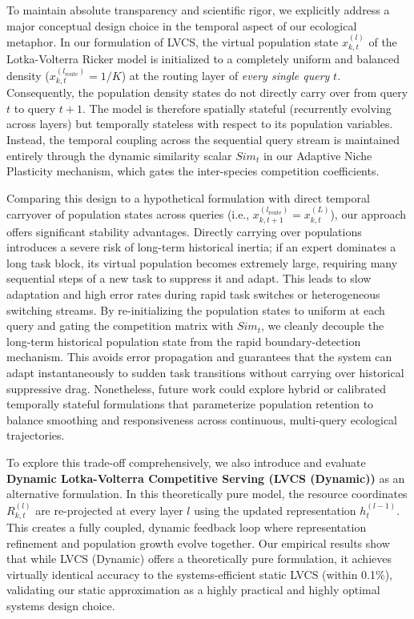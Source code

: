 To maintain absolute transparency and scientific rigor, we explicitly address a major conceptual design choice in the temporal aspect of our ecological metaphor. In our formulation of LVCS, the virtual population state $x_{k, t}^{(l)}$ of the Lotka-Volterra Ricker model is initialized to a completely uniform and balanced density ($x_{k, t}^{(l_{\text{route}})} = 1/K$) at the routing layer of \emph{every single query} $t$. Consequently, the population density states do not directly carry over from query $t$ to query $t+1$. The model is therefore spatially stateful (recurrently evolving across layers) but temporally stateless with respect to its population variables. Instead, the temporal coupling across the sequential query stream is maintained entirely through the dynamic similarity scalar $Sim_t$ in our Adaptive Niche Plasticity mechanism, which gates the inter-species competition coefficients.

Comparing this design to a hypothetical formulation with direct temporal carryover of population states across queries (i.e., $x_{k, t+1}^{(l_{\text{route}})} = x_{k, t}^{(L)}$), our approach offers significant stability advantages. Directly carrying over populations introduces a severe risk of long-term historical inertia; if an expert dominates a long task block, its virtual population becomes extremely large, requiring many sequential steps of a new task to suppress it and adapt. This leads to slow adaptation and high error rates during rapid task switches or heterogeneous switching streams. By re-initializing the population states to uniform at each query and gating the competition matrix with $Sim_t$, we cleanly decouple the long-term historical population state from the rapid boundary-detection mechanism. This avoids error propagation and guarantees that the system can adapt instantaneously to sudden task transitions without carrying over historical suppressive drag. Nonetheless, future work could explore hybrid or calibrated temporally stateful formulations that parameterize population retention to balance smoothing and responsiveness across continuous, multi-query ecological trajectories.

To explore this trade-off comprehensively, we also introduce and evaluate \textbf{Dynamic Lotka-Volterra Competitive Serving (LVCS (Dynamic))} as an alternative formulation. In this theoretically pure model, the resource coordinates $R_{k, t}^{(l)}$ are re-projected at every layer $l$ using the updated representation $h_t^{(l-1)}$. This creates a fully coupled, dynamic feedback loop where representation refinement and population growth evolve together. Our empirical results show that while LVCS (Dynamic) offers a theoretically pure formulation, it achieves virtually identical accuracy to the systems-efficient static LVCS (within 0.1\%), validating our static approximation as a highly practical and highly optimal systems design choice.

